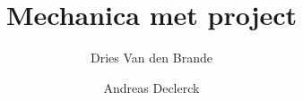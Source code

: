 \usepackage[dutch]{babel}
\usepackage{amsmath}

\title{Mechanica met project}
\author{Dries Van den Brande \and Andreas Declerck}
